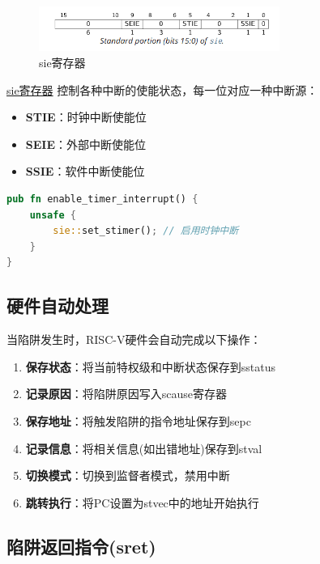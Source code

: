 \begin{figure}[htbp]
    \centering
    \includegraphics[width=0.7\textwidth]{../image/sie_.png}
    \caption{sie寄存器}
    \label{fig:sie}
\end{figure}

\href{https://five-embeddev.com/riscv-priv-isa-manual/Priv-v1.12/supervisor.html#supervisor-interrupt-registers-sip-and-sie}{sie寄存器}
控制各种中断的使能状态，每一位对应一种中断源：

\begin{itemize}
    \item \textbf{STIE}：时钟中断使能位
    \item \textbf{SEIE}：外部中断使能位  
    \item \textbf{SSIE}：软件中断使能位
\end{itemize}

\begin{lstlisting}[language=Rust,caption={中断使能设置}, label={lst:interrupt-enable}]
pub fn enable_timer_interrupt() {
    unsafe {
        sie::set_stimer(); // 启用时钟中断
    }
}
\end{lstlisting}

\subsection{硬件自动处理}

当陷阱发生时，RISC-V硬件会自动完成以下操作：

\begin{enumerate}
    \item \textbf{保存状态}：将当前特权级和中断状态保存到sstatus
    \item \textbf{记录原因}：将陷阱原因写入scause寄存器
    \item \textbf{保存地址}：将触发陷阱的指令地址保存到sepc
    \item \textbf{记录信息}：将相关信息(如出错地址)保存到stval
    \item \textbf{切换模式}：切换到监督者模式，禁用中断
    \item \textbf{跳转执行}：将PC设置为stvec中的地址开始执行
\end{enumerate}

\subsection{陷阱返回指令(sret)}


